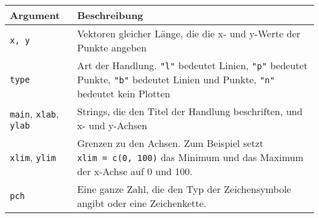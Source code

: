 \documentclass[
]{book}
\begin{document}
\begin{longtable}[]{@{}ll@{}}
\toprule
\begin{minipage}[b]{0.10\columnwidth}\raggedright
Argument\strut
\end{minipage} & \begin{minipage}[b]{0.84\columnwidth}\raggedright
Beschreibung\strut
\end{minipage}\tabularnewline
\midrule
\endhead
\begin{minipage}[t]{0.10\columnwidth}\raggedright
\texttt{x,\ y}\strut
\end{minipage} & \begin{minipage}[t]{0.84\columnwidth}\raggedright
Vektoren gleicher Länge, die die x- und y-Werte der Punkte angeben\strut
\end{minipage}\tabularnewline
\begin{minipage}[t]{0.10\columnwidth}\raggedright
\texttt{type}\strut
\end{minipage} & \begin{minipage}[t]{0.84\columnwidth}\raggedright
Art der Handlung. \texttt{"l"} bedeutet Linien, \texttt{"p"} bedeutet Punkte, \texttt{"b"} bedeutet Linien und Punkte, \texttt{"n"} bedeutet kein Plotten\strut
\end{minipage}\tabularnewline
\begin{minipage}[t]{0.10\columnwidth}\raggedright
\texttt{main}, \texttt{xlab}, \texttt{ylab}\strut
\end{minipage} & \begin{minipage}[t]{0.84\columnwidth}\raggedright
Strings, die den Titel der Handlung beschriften, und x- und y-Achsen\strut
\end{minipage}\tabularnewline
\begin{minipage}[t]{0.10\columnwidth}\raggedright
\texttt{xlim}, \texttt{ylim}\strut
\end{minipage} & \begin{minipage}[t]{0.84\columnwidth}\raggedright
Grenzen zu den Achsen. Zum Beispiel setzt \texttt{xlim\ =\ c(0,\ 100)} das Minimum und das Maximum der x-Achse auf 0 und 100.\strut
\end{minipage}\tabularnewline
\begin{minipage}[t]{0.10\columnwidth}\raggedright
\texttt{pch}\strut
\end{minipage} & \begin{minipage}[t]{0.84\columnwidth}\raggedright
Eine ganze Zahl, die den Typ der Zeichensymbole angibt oder eine Zeichenkette.\strut
\end{minipage}\tabularnewline

\end{longtable}
\end{document}
